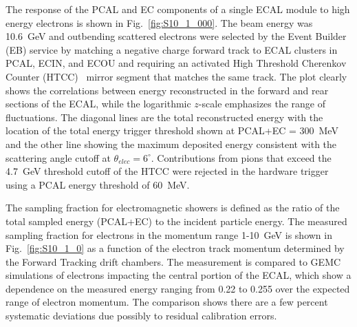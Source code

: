 The response of the PCAL and EC components of a single ECAL module to high energy electrons is shown in
Fig.~\ref{fig:S10_1_000}. The beam energy was 10.6~GeV and outbending scattered electrons were selected by
the Event Builder (EB) service by matching a negative charge forward track to ECAL clusters in PCAL, ECIN, and
ECOU and requiring an activated High Threshold Cherenkov Counter (HTCC)~\cite{nim:htcc} mirror segment that
matches the same track. The plot clearly shows the correlations between energy reconstructed in the forward
and rear sections of the ECAL, while the logarithmic $z$-scale emphasizes the range of fluctuations. The diagonal
lines are the total reconstructed  energy with the location of the total energy trigger threshold shown at PCAL+EC =
300~MeV and the other line showing the maximum deposited energy consistent with the scattering angle cutoff at
$\theta_{elec}=6^\circ$. Contributions from pions that exceed the 4.7~GeV threshold cutoff of the HTCC were
rejected in the hardware trigger using a PCAL energy threshold of 60~MeV.

The sampling fraction for electromagnetic showers is defined as the ratio of the total sampled energy
(PCAL+EC) to the incident particle energy. The measured sampling fraction for electrons in the momentum range 1-10~GeV is shown in
Fig.~\ref{fig:S10_1_0} as a function of the electron track momentum determined by the Forward Tracking 
drift chambers.  The measurement is compared to GEMC simulations of electrons impacting the central portion of the ECAL,
which show a dependence on the measured energy ranging from 0.22 to 0.255 over the expected range of electron
momentum. The comparison shows there are a few percent systematic deviations due possibly to residual calibration errors.

